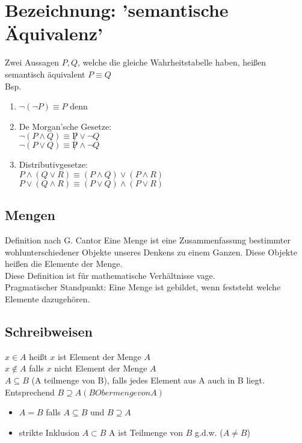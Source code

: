 \section{Bezeichnung: 'semantische Äquivalenz'}
Zwei Aussagen $P, Q$, welche die gleiche Wahrheitstabelle haben, heißen semantisch äquivalent $P \equiv Q$\\
Bsp.
\begin{enumerate}
\item $\neg(\neg P) \equiv P$ denn %
\item De Morgan'sche Gesetze:\\
$\neg (P \wedge Q) \equiv \not P \vee \neg Q$\\
$\neg (P \vee Q) \equiv \not P \wedge \neg Q$
\item Distributivgesetze:\\
$P \wedge (Q \vee R) \equiv (P \wedge Q) \vee (P \wedge R)$\\
$P \vee (Q \wedge R) \equiv (P \vee Q) \wedge (P \vee R)$
\end{enumerate}
\subsection*{Mengen}
Definition nach G. Cantor Eine Menge ist eine Zusammenfassung bestimmter wohlunterschiedener Objekte unseres Denkens zu einem Ganzen. Diese Objekte heißen die Elemente der Menge.\\
Diese Definition ist für mathematische Verhältnisse vage.\\
Pragmatischer Standpunkt: Eine Menge ist gebildet, wenn feststeht welche Elemente dazugehören.\\
\subsection*{Schreibweisen}
$x \in A$ heißt $x$ ist Element der Menge $A$\\
$x \notin A$ falls $x$ nicht Element der Menge $A$\\
$A \subseteq B$ (A teilmenge von B), falls jedes Element aus A auch in B liegt.\\
Entsprechend $B \supseteq A (B Obermenge von A)$\\
\begin{itemize}
\item $A = B$ falls $A \subseteq B$ und $B \supseteq A$
\item strikte Inklusion $A \subset B$ A ist Teilmenge von $B$ g.d.w. ($A \neq B$)
\end{itemize}


